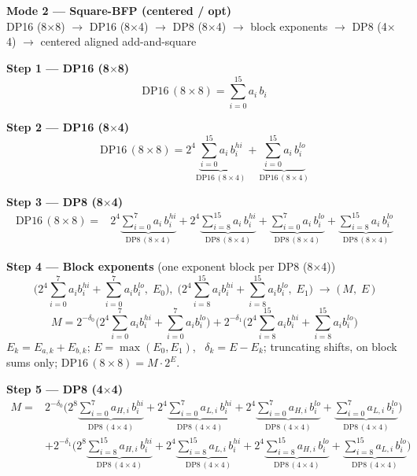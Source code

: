 \documentclass[fleqn]{article}
\newcommand{\DPop}[3]{\mathrm{DP#1}\,(#2\!\times\!#3)}
\begin{document}
\begin{center}
{\LARGE \textbf{Mode 2 --- Square-BFP (centered / opt)}}\\[4pt]
{\large DP16 (8$\times$8) $\rightarrow$ DP16 (8$\times$4) $\rightarrow$ DP8 (8$\times$4) $\rightarrow$ block exponents $\rightarrow$ DP8 (4$\times$4) $\rightarrow$ centered aligned add-and-square}
\end{center}

\textbf{Step 1 --- DP16 (8$\times$8)}
\[ \DPop{16}{8}{8} = \sum_{i=0}^{15} a_i \, b_i \]

\textbf{Step 2 --- DP16 (8$\times$4)}
\[ \DPop{16}{8}{8} = 2^{4}\underbrace{\sum_{i=0}^{15} a_i \, b_i^{hi}}_{\DPop{16}{8}{4}} + \underbrace{\sum_{i=0}^{15} a_i \, b_i^{lo}}_{\DPop{16}{8}{4}} \]

\textbf{Step 3 --- DP8 (8$\times$4)}
\begin{align*}
\DPop{16}{8}{8} = {}
  & 2^{4}\underbrace{\sum_{i=0}^{7} a_i \, b_i^{hi}}_{\DPop{8}{8}{4}}
  + 2^{4}\underbrace{\sum_{i=8}^{15} a_i \, b_i^{hi}}_{\DPop{8}{8}{4}}
  + \underbrace{\sum_{i=0}^{7} a_i \, b_i^{lo}}_{\DPop{8}{8}{4}}
  + \underbrace{\sum_{i=8}^{15} a_i \, b_i^{lo}}_{\DPop{8}{8}{4}}
\end{align*}

\textbf{Step 4 --- Block exponents}\quad
{\small(one exponent block per DP8 (8$\times$4))}
\[
\Big(2^{4}\!\sum_{i=0}^{7} a_i b_i^{hi} + \sum_{i=0}^{7} a_i b_i^{lo},\; E_0\Big) ,\;
\Big(2^{4}\!\sum_{i=8}^{15} a_i b_i^{hi} + \sum_{i=8}^{15} a_i b_i^{lo},\; E_1\Big)
\;\longrightarrow\;
\Big(\, M ,\; E \,\Big)
\]
\[
M = 2^{-\delta_0}\Big(2^{4}\!\sum_{i=0}^{7} a_i b_i^{hi} + \sum_{i=0}^{7} a_i b_i^{lo}\Big)
  + 2^{-\delta_1}\Big(2^{4}\!\sum_{i=8}^{15} a_i b_i^{hi} + \sum_{i=8}^{15} a_i b_i^{lo}\Big)
\]
$E_k=E_{a,k}+E_{b,k}$; \quad $E=\max(E_0,E_1)$, \ $\delta_k=E-E_k$; \quad truncating shifts, on block sums only; \quad $\DPop{16}{8}{8}=M\cdot2^{E}$.

\textbf{Step 5 --- DP8 (4$\times$4)}
\begin{align*}
M = {}
  & 2^{-\delta_0}\Big( 2^{8}\underbrace{\sum_{i=0}^{7} a_{H,i}\, b_i^{hi}}_{\DPop{8}{4}{4}}
  + 2^{4}\underbrace{\sum_{i=0}^{7} a_{L,i}\, b_i^{hi}}_{\DPop{8}{4}{4}}
  + 2^{4}\underbrace{\sum_{i=0}^{7} a_{H,i}\, b_i^{lo}}_{\DPop{8}{4}{4}}
  + \underbrace{\sum_{i=0}^{7} a_{L,i}\, b_i^{lo}}_{\DPop{8}{4}{4}} \Big) \\[0.15em]
  & + 2^{-\delta_1}\Big( 2^{8}\underbrace{\sum_{i=8}^{15} a_{H,i}\, b_i^{hi}}_{\DPop{8}{4}{4}}
  + 2^{4}\underbrace{\sum_{i=8}^{15} a_{L,i}\, b_i^{hi}}_{\DPop{8}{4}{4}}
  + 2^{4}\underbrace{\sum_{i=8}^{15} a_{H,i}\, b_i^{lo}}_{\DPop{8}{4}{4}}
  + \underbrace{\sum_{i=8}^{15} a_{L,i}\, b_i^{lo}}_{\DPop{8}{4}{4}} \Big)
\end{align*}
\end{document}
